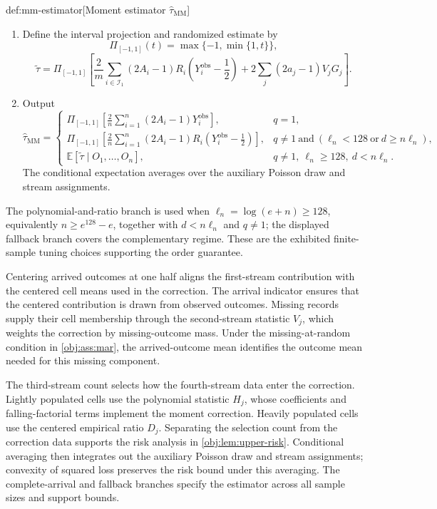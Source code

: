 \begin{algorithmv}{def:mm-estimator}[Moment estimator $\widehat\tau_{\mathrm{MM}}$]
\begin{enumerate}
\item Define the interval projection and randomized estimate by
\[
\Pi_{[-1,1]}(t)=\max\{-1,\min\{1,t\}\},
\]
\[
\widetilde\tau
=\Pi_{[-1,1]}\!\left[
\frac2m\sum_{i\in\mathcal I_1}(2A_i-1)R_i
\left(Y_i^{\mathrm{obs}}-\frac12\right)
+2\sum_j(2a_j-1)V_jG_j
\right].
\]

\item Output
\[
\widehat\tau_{\mathrm{MM}}
=
\begin{cases}
\displaystyle
\Pi_{[-1,1]}\!\left[
\frac2n\sum_{i=1}^n(2A_i-1)Y_i^{\mathrm{obs}}
\right],
&q=1,\\[8pt]
\displaystyle
\Pi_{[-1,1]}\!\left[
\frac2n\sum_{i=1}^n(2A_i-1)R_i
\left(Y_i^{\mathrm{obs}}-\frac12\right)
\right],
&q\ne1\ \text{and}\ (\ell_n<128\ \text{or}\ d\ge n\ell_n),\\[8pt]
\displaystyle
\mathbb E[\widetilde\tau\mid O_1,\ldots,O_n],
&q\ne1,\ \ell_n\ge128,\ d<n\ell_n.
\end{cases}
\]
The conditional expectation averages over the auxiliary Poisson draw and stream assignments.
\end{enumerate}
\end{algorithmv}

The polynomial-and-ratio branch is used when \(\ell_n=\log(e+n)\ge128\), equivalently \(n\ge e^{128}-e\), together with \(d<n\ell_n\) and \(q\ne1\); the displayed fallback branch covers the complementary regime. These are the exhibited finite-sample tuning choices supporting the order guarantee.

Centering arrived outcomes at one half aligns the first-stream contribution with the centered cell means used in the correction. The arrival indicator ensures that the centered contribution is drawn from observed outcomes. Missing records supply their cell membership through the second-stream statistic \(V_j\), which weights the correction by missing-outcome mass. Under the missing-at-random condition in \cref{obj:ass:mar}, the arrived-outcome mean identifies the outcome mean needed for this missing component.

The third-stream count selects how the fourth-stream data enter the correction. Lightly populated cells use the polynomial statistic \(H_j\), whose coefficients and falling-factorial terms implement the moment correction. Heavily populated cells use the centered empirical ratio \(D_j\). Separating the selection count from the correction data supports the risk analysis in \cref{obj:lem:upper-risk}. Conditional averaging then integrates out the auxiliary Poisson draw and stream assignments; convexity of squared loss preserves the risk bound under this averaging. The complete-arrival and fallback branches specify the estimator across all sample sizes and support bounds.

